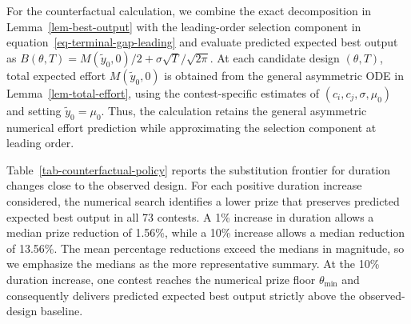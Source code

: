 \documentclass[mnsc]{informs3}
\begin{document}
For the counterfactual calculation, we combine the exact decomposition in Lemma~\ref{lem-best-output} with the leading-order selection component in equation~\eqref{eq-terminal-gap-leading} and evaluate predicted expected best output as $B(\theta,T)=M(\tilde y_0,0)/2+\sigma\sqrt T/\sqrt{2\pi}$. At each candidate design $(\theta,T)$, total expected effort $M(\tilde y_0,0)$ is obtained from the general asymmetric ODE in Lemma~\ref{lem-total-effort}, using the contest-specific estimates of $(c_i,c_j,\sigma,\mu_0)$ and setting $\tilde y_0=\mu_0$. Thus, the calculation retains the general asymmetric numerical effort prediction while approximating the selection component at leading order.

Table~\ref{tab-counterfactual-policy} reports the substitution frontier for duration changes close to the observed design. For each positive duration increase considered, the numerical search identifies a lower prize that preserves predicted expected best output in all 73 contests. A 1\% increase in duration allows a median prize reduction of 1.56\%, while a 10\% increase allows a median reduction of 13.56\%. The mean percentage reductions exceed the medians in magnitude, so we emphasize the medians as the more representative summary. At the 10\% duration increase, one contest reaches the numerical prize floor $\theta_{\min}$ and consequently delivers predicted expected best output strictly above the observed-design baseline.
\end{document}
